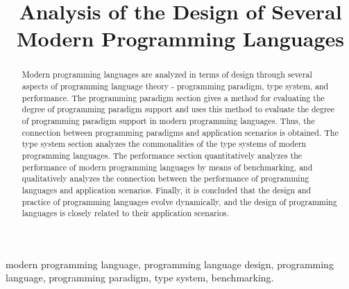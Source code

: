 \documentclass[10pt,conference,letterpaper]{IEEEtran}
\begin{document}
    \title{Analysis of the Design of Several Modern Programming Languages\\
    }

    \author{
    }

    \maketitle

    \begin{abstract}
        Modern programming languages are analyzed in terms of design through several aspects of programming language theory - programming paradigm, type system, and performance. The programming paradigm section gives a method for evaluating the degree of programming paradigm support and uses this method to evaluate the degree of programming paradigm support in modern programming languages. Thus, the connection between programming paradigms and application scenarios is obtained. The type system section analyzes the commonalities of the type systems of modern programming languages. The performance section quantitatively analyzes the performance of modern programming languages by means of benchmarking, and qualitatively analyzes the connection between the performance of programming languages and application scenarios. Finally, it is concluded that the design and practice of programming languages evolve dynamically, and the design of programming languages is closely related to their application scenarios.
    \end{abstract}

    \begin{IEEEkeywords}
        modern programming language,
        programming language design,
        programming language,
        programming paradigm,
        type system,
        benchmarking.
    \end{IEEEkeywords}


    
    
    
    
    
    


    
    
\end{document}
